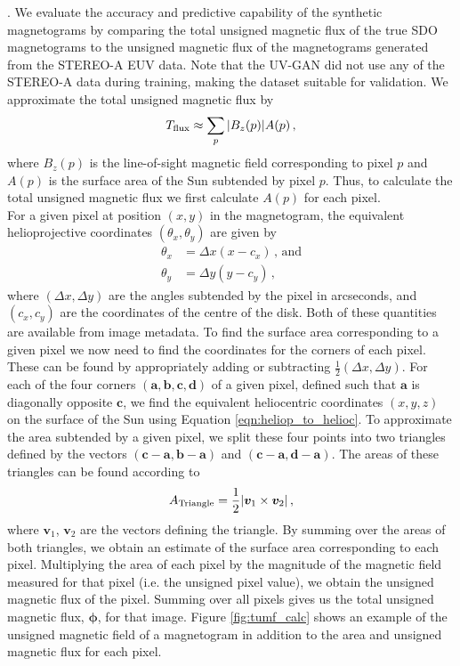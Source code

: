 \documentclass[11pt,a4paper,onecolumn]{report}
\DeclarePairedDelimiter{\abs}{\lvert}{\rvert}
\begin{document}
\citep{song_statistical_2009,yuan_solar_2010,lan_automated_2012,chen_identifying_2019}.
We evaluate the accuracy and predictive capability of the synthetic magnetograms
by comparing the total unsigned magnetic flux of the true SDO magnetograms to
the unsigned magnetic flux of the magnetograms generated from the STEREO-A EUV
data. Note that the UV-GAN did not use any of the STEREO-A data during training,
making the dataset suitable for validation. We approximate the total unsigned
magnetic flux by 
\begin{align}
  T_{\text{flux}} \approx \sum\limits_p \absolutevalue{B_z(p)} A(p) \, ,
\end{align}
where $B_z(p)$ is the line-of-sight magnetic field corresponding to pixel $p$
and $A(p)$ is the surface area of the Sun subtended by pixel $p$. Thus, to
calculate the total unsigned magnetic flux we first calculate $A(p)$ for each
pixel.\\

For a given pixel at position \( (x, y) \) in the magnetogram, the equivalent
helioprojective coordinates \((\theta_x, \theta_y)\) are given by
\begin{align}
  \theta_x &= \Delta x (x - c_x) \, \text{, and} \\
  \theta_y &= \Delta y (y - c_y) \, ,
\end{align}
where  \((\Delta x, \Delta y)\) are the angles subtended by the pixel in
arcseconds, and \( (c_x, c_y) \) are the coordinates of the centre of the disk.
Both of these quantities are available from image metadata. To find the surface
area corresponding to a given pixel we now need to find the coordinates for the
corners of each pixel. These can be found by appropriately adding or subtracting
\(\frac{1}{2} (\Delta x, \Delta y)\). For each of the four corners \((\bm{a},
\bm{b}, \bm{c}, \bm{d})\) of a given pixel, defined such that $\bm{a}$ is
diagonally opposite $\bm{c}$, we find the equivalent heliocentric coordinates
\((x, y, z)\) on the surface of the Sun using Equation
\ref{eqn:heliop_to_helioc}. To approximate the area subtended by a given pixel,
we split these four points into two triangles defined by the vectors
\((\bm{c}-\bm{a}, \bm{b} - \bm{a}) \) and \((\bm{c}-\bm{a}, \bm{d} - \bm{a}) \).
The areas of these triangles can be found according to
\begin{align}
  A_{\text{Triangle}} = \frac{1}{2} \abs*{\bm{v}_1 \times \bm{v}_2} \, ,
\end{align}
where \(\bm{v}_1\), \(\bm{v}_2\) are the vectors defining the triangle. By
summing over the areas of both triangles, we obtain an estimate of the surface
area corresponding to each pixel. Multiplying the area of each pixel by the
magnitude of the magnetic field measured for that pixel (i.e. the unsigned pixel
value), we obtain the unsigned magnetic flux of the pixel. Summing over all
pixels gives us the total unsigned magnetic flux, \(\bm{\phi}\), for that image.
Figure \ref{fig:tumf_calc} shows an example of the unsigned magnetic field of a
magnetogram in addition to the area and unsigned magnetic flux for each pixel.
\\
\end{document}
